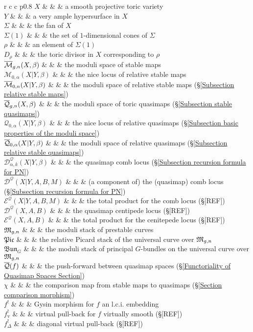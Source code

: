 \begin{longtabu}{r c c p{0.8\linewidth}}
$X$ & & & a smooth projective toric variety \\
$Y$ & & & a very ample hypersurface in $X$ \\
$\Sigma$ & & & the fan of $X$ \\
$\Sigma(1)$ & & & the set of $1$-dimensional cones of $\Sigma$ \\
$\rho$ & & & an element of $\Sigma(1)$ \\
$D_\rho$ & & & the toric divisor in $X$ corresponding to $\rho$ \\
$\overline{\mathcal M}_{g,n}(X,\beta)$ & & & the moduli space of stable maps \\
$\mathcal{M}_{0,\alpha}(X|Y,\beta)$ & & & the nice locus of relative stable maps \\
$\overline{\mathcal M}_{0,n}(X|Y,\beta)$ & & & the moduli space of relative stable maps (\S \ref{Subsection relative stable maps}) \\
$\overline{\mathcal Q}_{g,n}(X,\beta)$ & & & the moduli space of toric quasimaps (\S \ref{Subsection stable quasimaps}) \\
$\mathcal{Q}_{0,\alpha}(X|Y,\beta)$ & & & the nice locus of relative quasimaps (\S \ref{Subsection basic properties of the moduli space}) \\
$\overline{\mathcal Q}_{0,\alpha}(X|Y,\beta)$ & & & the moduli space of relative quasimaps (\S \ref{Subsection relative stable quasimaps}) \\
$\mathcal{D}^{\mathcal{Q}}_{\alpha,k}(X|Y,\beta)$ & & & the quasimap comb locus (\S \ref{Subsection recursion formula for PN}) \\
$\mathcal{D}^{\mathcal{Q}}(X|Y,A,B,M)$ & & & (a component of) the (quasimap) comb locus (\S \ref{Subsection recursion formula for PN}) \\
$\mathcal{E}^{\mathcal{Q}}(X|Y,A,B,M)$ & & & the total product for the comb locus (\S [REF]) \\
$\mathcal{D}^{\mathcal{Q}}(X,A,B)$ & & & the quasimap centipede locus (\S [REF])  \\
$\mathcal{E}^{\mathcal{Q}}(X,A,B)$ & & & the total product for the cenitepede locus (\S [REF]) \\
$\mathfrak M_{g,n}$ & & & the moduli stack of prestable curves \\
$\mathfrak{Pic}$ & & & the relative Picard stack of the universal curve over $\mathfrak M_{g,n}$ \\
$\mathfrak{Bun}_{G}$ & & & the moduli stack of principal $G$-bundles on the universal curve over $\mathfrak M_{g,n}$ \\
$\overline{\mathcal{Q}}(f)$ & & & the push-forward between quasimap spaces (\S \ref{Functoriality of Quasimap Spaces Section}) \\
$\chi$ & & & the comparison map from stable maps to quasimaps (\S \ref{Section comparison morphism}) \\
$f^!$ & & & Gysin morphism for $f$ an l.c.i. embedding \\
$f^!_{\text{v}}$ & & & virtual pull-back for $f$ virtually smooth (\S [REF]) \\
$f^!_{\Delta}$ & & & diagonal virtual pull-back (\S [REF])
\end{longtabu}